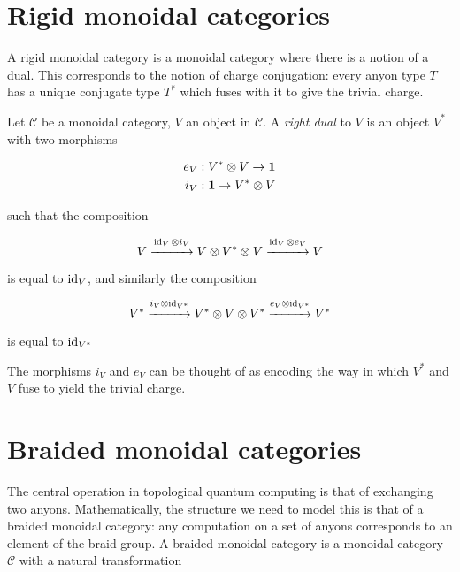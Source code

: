 \section{Rigid monoidal categories}

A rigid monoidal category is a monoidal category where there is a notion of a
dual. This corresponds to the notion of charge conjugation: every anyon type
$T$ has a unique conjugate type $T^*$ which fuses with it to give the trivial
charge.

\begin{defn}
    Let $\mathcal{C}$ be a monoidal category, $V$ an object in $\mathcal{C}$. A
    \emph{right dual} to $V$ is an object $V^*$ with two morphisms

    \begin{align}
        e_V: V^* \otimes V \to \mathbf{1}  \\
        i_V: \mathbf{1} \to V^* \otimes V
    \end{align}
\end{defn}

such that the composition

\begin{equation}
    V \stackrel{ \operatorname{id}_V \otimes i_V }{\xrightarrow{\hspace*{1cm}}} V \otimes V^*
    \otimes V  \stackrel{\operatorname{id}_V \otimes e_V}{\xrightarrow{\hspace*{1cm}}} V
\end{equation}

is equal to $\operatorname{id}_V$, and similarly the composition

\begin{equation}
    V^* \stackrel{i_V \otimes \operatorname{id}_{V^*} }{\xrightarrow{\hspace*{1cm}}} V^*
    \otimes V \otimes V^*  \stackrel{e_V \otimes
    \operatorname{id}_{V^*}}{\xrightarrow{\hspace*{1cm}}} V^*
\end{equation}

is equal to $\operatorname{id}_{V^*}$

The morphisms $i_V$ and $e_V$ can be thought of as encoding the way in which
$V^*$ and $V$ fuse to yield the trivial charge.
   
\section{Braided monoidal categories}
\label{section:Braiding}

The central operation in topological quantum computing is that of exchanging
two anyons. Mathematically, the structure we need to model this is that of a
braided monoidal category: any computation on a set of anyons corresponds to
an element of the braid group. A braided monoidal category is a monoidal
category $\mathcal{C}$ with a natural transformation

